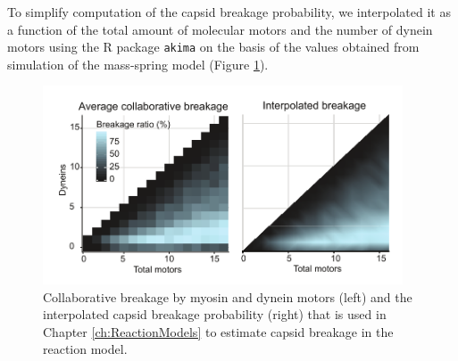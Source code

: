 To simplify computation of the capsid breakage probability, we interpolated it as a function of the total amount of molecular motors and the number of dynein motors using the R package \texttt{akima} on the basis of the values obtained from simulation of the mass-spring model (Figure \ref{figure:MassSpringInterpolation}).

\begin{figure}
\begin{center}
\includegraphics[width=0.95\textwidth, trim={0cm 0cm 0cm 0cm}, clip]{D_chapters/1_TugOfWar/SUPPLEMENTARYFIGURE1D.pdf}
\caption[Collaborative breakage by molecular motors and the interpolated capsid breakage probability]%
{Collaborative breakage by myosin and dynein motors (left) and the interpolated capsid breakage probability (right) that is used in Chapter \ref{ch:ReactionModels} to estimate capsid breakage in the reaction model.}
\label{figure:MassSpringInterpolation}
\end{center}
\end{figure}
